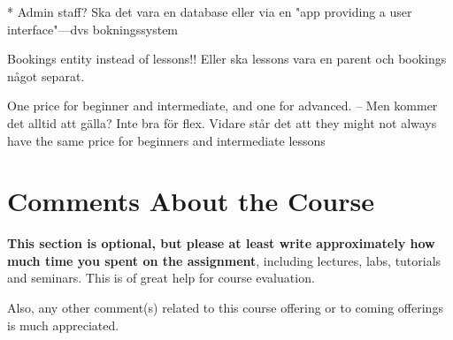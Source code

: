 \documentclass[a4paper]{scrartcl}
\begin{document}
* Admin staff? Ska det vara en database eller via en "app providing a user interface"---dvs bokningssystem

Bookings entity instead of lessons!! Eller ska lessons vara en parent och bookings något separat.

One price for beginner and intermediate, and one for advanced. -- Men kommer det alltid att gälla? Inte bra för flex. Vidare står det att they might not always
have the same price for beginners and intermediate lessons


\section{Comments About the Course}

\textbf{This section is optional, but please at least write approximately how much time you spent on the assignment}, including lectures, labs, tutorials and seminars. This is of great help for course evaluation.

Also, any other comment(s) related to this course offering or to coming offerings is much appreciated. 
\end{document}
